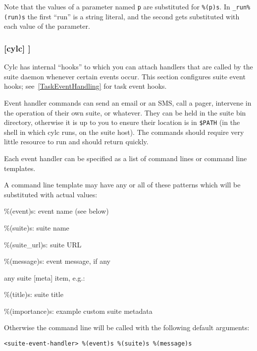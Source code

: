 Note that the values of a parameter named \lstinline=p= are substituted for
\lstinline=%(p)s=.
In \lstinline=_run%(run)s= the first ``run'' is a string literal, and the second
gets substituted with each value of the parameter.

\subsubsection[{[[}events{]]}]{[cylc] \textrightarrow [[events]]}
\label{SuiteEventHandling}

Cylc has internal ``hooks'' to which you can attach handlers that are
called by the suite daemon whenever certain events occur. This section
configures suite event hooks; see~\ref{TaskEventHandling} for
task event hooks.

Event handler commands can send an email or an SMS, call a pager, intervene in
the operation of their own suite, or whatever.
They can be held in the suite bin directory, otherwise it is up to you
to ensure their location is in \lstinline=$PATH= (in the shell in which
cylc runs, on the suite host). The commands should require
very little resource to run and should return quickly.

Each event handler can be specified as a list of command lines or command
line templates.

A command line template may have any or all of these patterns which will be
substituted with actual values:
\begin{myitemize}
    \item \%(event)s: event name (see below)
    \item \%(suite)s: suite name
    \item \%(suite\_url)s: suite URL
    \item \%(message)s: event message, if any
    \item any suite [meta] item, e.g.:
    \begin{myitemize}
      \item \%(title)s: suite title
      \item \%(importance)s: example custom suite metadata
    \end{myitemize}
\end{myitemize}

Otherwise the command line will be called with the following default
arguments:
\begin{lstlisting}
<suite-event-handler> %(event)s %(suite)s %(message)s
\end{lstlisting}

